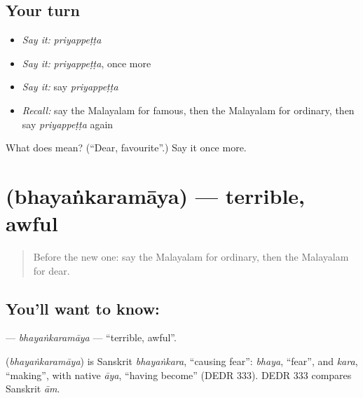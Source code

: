 \subsection*{Your turn}
\begin{itemize}
\raggedright
  \item \emph{Say it:} \emph{priyappeṭṭa}
  \item \emph{Say it:} \emph{priyappeṭṭa}, once more
  \item \emph{Say it:} say \emph{priyappeṭṭa}
  \item \emph{Recall:} say the Malayalam for famous, then the Malayalam for ordinary, then say \emph{priyappeṭṭa} again
\end{itemize}

\begin{tcolorbox}[breakable,colback=teal!4,colframe=teal!35!black,title={Before you move on}]
What does  mean? (\textquotedblleft{}Dear, favourite\textquotedblright{}.) Say it once more.
\end{tcolorbox}
\section[\texorpdfstring{\ml{ഭയങ്കരമായ} (bhayaṅkaramāya)}{ഭയങ്കരമായ (bhayaṅkaramāya)}]{ (bhayaṅkaramāya) — terrible, awful}

\label{lesson:ML-C320-bhayankaramaya}



\begin{quote}
Before the new one: say the Malayalam for ordinary, then the Malayalam for dear.
\end{quote}

\subsection*{You'll want to know: }
\textbf{} — \emph{bhayaṅkaramāya} — \textquotedblleft{}terrible, awful\textquotedblright{}.

\begin{cousinweb}
\textbf{} (\emph{bhayaṅkaramāya}) is Sanskrit \emph{bhayaṅkara}, \textquotedblleft{}causing fear\textquotedblright{}: \emph{bhaya}, \textquotedblleft{}fear\textquotedblright{}, and \emph{kara}, \textquotedblleft{}making\textquotedblright{}, with native \emph{āya}, \textquotedblleft{}having become\textquotedblright{} (DEDR 333). DEDR 333 compares Sanskrit \emph{ām}.
\end{cousinweb}

